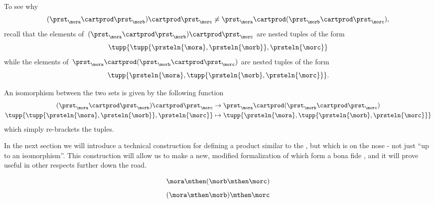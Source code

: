 To see why
\begin{equation}
    \label{eq:assoc-fails1}
    (\prst_{\mora} \cartprod \prst_{\morb}) \cartprod \prst_{\morc} \neq \prst_{\mora} \cartprod (\prst_{\morb} \cartprod \prst_{\morc}),
\end{equation}
recall that the elements of~$(\prst_{\mora} \cartprod \prst_{\morb}) \cartprod \prst_{\morc}$ are nested tuples of the form
\begin{equation}
    \tupp{ \tupp{\prsteln{\mora}, \prsteln{\morb}}, \prsteln{\morc} }
\end{equation}
while the elements of~$\prst_{\mora} \cartprod (\prst_{\morb} \cartprod \prst_{\morc})$ are nested tuples of the form
\begin{equation}
    \tupp{\prsteln{\mora}, \tupp{\prsteln{\morb}, \prsteln{\morc}} }.
\end{equation}

An isomorphism between the two sets is given by the following function
\begin{equation}
    \label{eq:assoc-fails2}
    \begin{aligned}
        (\prst_{\mora} \cartprod \prst_{\morb})
        \cartprod \prst_{\morc}                                           & \to \prst_{\mora} \cartprod (\prst_{\morb} \cartprod \prst_{\morc}) \\
        \tupp{ \tupp{\prsteln{\mora}, \prsteln{\morb}}, \prsteln{\morc} } & \mapsto \tupp{\prsteln{\mora}, \tupp{\prsteln{\morb}, \prsteln{\morc}} }
    \end{aligned}
\end{equation}
which simply re-brackets the tuples.

In the next section we will introduce a technical construction for defining a product similar to the , but which is  on the nose - not just ``up to an isomorphism''.
This construction will allow us to make a new, modified formalization of  which form a bona fide , and it will prove useful in other respects further down the road.

\begin{forslides}
    \begin{equation}
        \label{eq:moore-assoc-a}
        \mora \mthen (\morb \mthen \morc)
    \end{equation}
    \begin{equation}
        \label{eq:moore-assoc-b}
        (\mora \mthen \morb) \mthen \morc
    \end{equation}
\end{forslides}